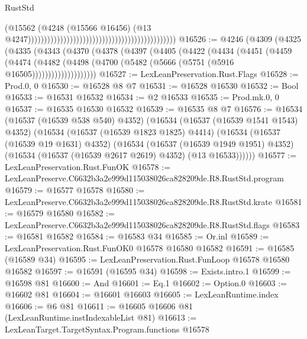 \begin{lexlean}{RustStd}
\begin{coremodule}
                                                                                          (@15562
                                                                                            (@4248
                                                                                              (@15566
                                                                                                @16456)
                                                                                              (@13
                                                                                                @4247))))))))))))))))))))))))))))))))))))))))))))))
@16526 := @4246
    (@4309
      (@4325
        (@4335
          (@4343
            (@4370
              (@4378
                (@4397
                  (@4405
                    (@4422
                      (@4434
                        (@4451
                          (@4459
                            (@4474
                              (@4482
                                (@4498 (@4700 (@5482 (@5666 (@5751 (@5916 @16505))))))))))))))))))))
@16527 := LexLeanPreservation.Rust.Flags
@16528 := Prod.{0, 0}
@16530 := @16528 @8 @7
@16531 := @16528 @16530
@16532 := Bool
@16533 := @16531 @16532
@16534 := @2 @16533
@16535 := Prod.mk.{0, 0}
@16537 := @16535 @16530 @16532
@16539 := @16535 @8 @7
@16576 := @16534
    (@16537 (@16539 @538 @540) @4352)
    (@16534
      (@16537 (@16539 @1541 @1543) @4352)
      (@16534
        (@16537 (@16539 @1823 @1825) @4414)
        (@16534
          (@16537 (@16539 @19 @1631) @4352)
          (@16534
            (@16537 (@16539 @1949 @1951) @4352)
            (@16534 (@16537 (@16539 @2617 @2619) @4352) (@13 @16533))))))
@16577 := LexLeanPreservation.Rust.FunOK
@16578 := LexLeanPreserve.C6632b3a2e999d115038026ca828209de.R8.RustStd.program
@16579 := @16577 @16578
@16580 := LexLeanPreserve.C6632b3a2e999d115038026ca828209de.R8.RustStd.krate
@16581 := @16579 @16580
@16582 := LexLeanPreserve.C6632b3a2e999d115038026ca828209de.R8.RustStd.flags
@16583 := @16581 @16582
@16584 := @16583 @34
@16585 := Or.inl
@16589 := LexLeanPreservation.Rust.FunOK0 @16578 @16580 @16582
@16591 := @16585 (@16589 @34)
@16595 := LexLeanPreservation.Rust.FunLoop @16578 @16580 @16582
@16597 := @16591 (@16595 @34)
@16598 := Exists.intro.{1}
@16599 := @16598 @81
@16600 := And
@16601 := Eq.{1}
@16602 := Option.{0}
@16603 := @16602 @81
@16604 := @16601 @16603
@16605 := LexLeanRuntime.index
@16606 := @6 @81
@16611 := @16605 @16606 @81 (LexLeanRuntime.instIndexableList @81)
@16613 := LexLeanTarget.TargetSyntax.Program.functions @16578

\end{coremodule}
\end{lexlean}
